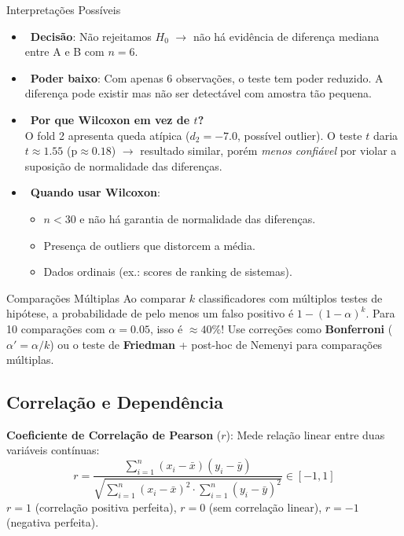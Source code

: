 \documentclass[12pt,a4paper]{article}
\begin{document}
\begin{exemplobox}{Interpretações Possíveis}
\begin{itemize}
  \item {}\ \textbf{Decisão}: Não rejeitamos $H_0$ $\rightarrow$ não há evidência de diferença mediana entre A e B com $n=6$.
  \item {}\ \textbf{Poder baixo}: Com apenas 6 observações, o teste tem poder reduzido. A diferença pode existir mas não ser detectável com amostra tão pequena.
  \item {}\ \textbf{Por que Wilcoxon em vez de $t$?}\\
    O fold 2 apresenta queda atípica ($d_2 = -7{.}0$, possível outlier). O teste $t$ daria $t \approx 1{.}55$ (p$\approx 0{.}18$) $\rightarrow$  resultado similar, porém \textit{menos confiável} por violar a suposição de normalidade das diferenças.
  \item {}\ \textbf{Quando usar Wilcoxon}:
    \begin{itemize}
      \item $n < 30$ e não há garantia de normalidade das diferenças.
      \item Presença de outliers que distorcem a média.
      \item Dados ordinais (ex.: scores de ranking de sistemas).
    \end{itemize}
\end{itemize}
\end{exemplobox}

\begin{atencaobox}{Comparações Múltiplas}
Ao comparar $k$ classificadores com múltiplos testes de hipótese, a probabilidade de pelo menos um falso positivo é $1-(1-\alpha)^k$. Para 10 comparações com $\alpha=0.05$, isso é $\approx 40\%$! Use correções como \textbf{Bonferroni} ($\alpha' = \alpha/k$) ou o teste de \textbf{Friedman} + post-hoc de Nemenyi para comparações múltiplas.
\end{atencaobox}

\subsection{Correlação e Dependência}

\textbf{Coeficiente de Correlação de Pearson} ($r$): Mede relação linear entre duas variáveis contínuas:
\[
  r = \frac{\sum_{i=1}^{n}(x_i - \bar{x})(y_i - \bar{y})}{\sqrt{\sum_{i=1}^{n}(x_i - \bar{x})^2 \cdot \sum_{i=1}^{n}(y_i - \bar{y})^2}}
  \in [-1, 1]
\]
$r = 1$ (correlação positiva perfeita), $r = 0$ (sem correlação linear), $r = -1$ (negativa perfeita).
\end{document}
